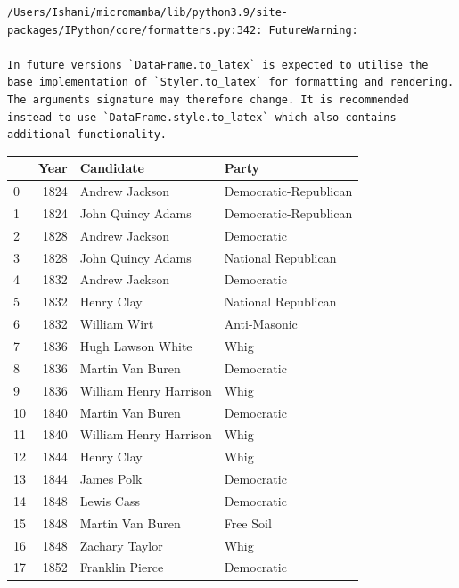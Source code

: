 \documentclass[
  letterpaper,
  DIV=11,
  numbers=noendperiod]{scrreprt}
\begin{document}
\begin{verbatim}
/Users/Ishani/micromamba/lib/python3.9/site-packages/IPython/core/formatters.py:342: FutureWarning:

In future versions `DataFrame.to_latex` is expected to utilise the base implementation of `Styler.to_latex` for formatting and rendering. The arguments signature may therefore change. It is recommended instead to use `DataFrame.style.to_latex` which also contains additional functionality.
\end{verbatim}

\begin{tabular}{lrll}
\toprule
{} &  Year &               Candidate &                  Party \\
\midrule
0   &  1824 &          Andrew Jackson &  Democratic-Republican \\
1   &  1824 &       John Quincy Adams &  Democratic-Republican \\
2   &  1828 &          Andrew Jackson &             Democratic \\
3   &  1828 &       John Quincy Adams &    National Republican \\
4   &  1832 &          Andrew Jackson &             Democratic \\
5   &  1832 &              Henry Clay &    National Republican \\
6   &  1832 &            William Wirt &           Anti-Masonic \\
7   &  1836 &       Hugh Lawson White &                   Whig \\
8   &  1836 &        Martin Van Buren &             Democratic \\
9   &  1836 &  William Henry Harrison &                   Whig \\
10  &  1840 &        Martin Van Buren &             Democratic \\
11  &  1840 &  William Henry Harrison &                   Whig \\
12  &  1844 &              Henry Clay &                   Whig \\
13  &  1844 &              James Polk &             Democratic \\
14  &  1848 &              Lewis Cass &             Democratic \\
15  &  1848 &        Martin Van Buren &              Free Soil \\
16  &  1848 &          Zachary Taylor &                   Whig \\
17  &  1852 &         Franklin Pierce &             Democratic \\

\end{tabular}
\end{document}
